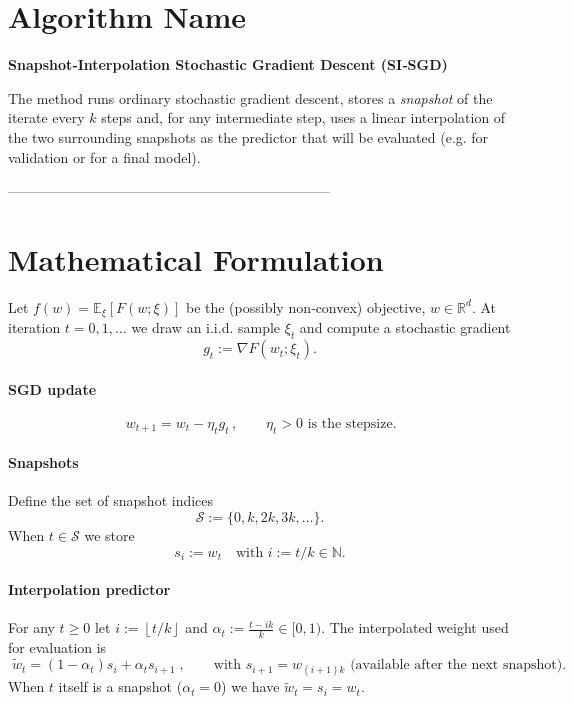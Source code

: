 \documentclass{article}
\newcommand{\R}{\mathbb{R}}
\begin{document}
\section*{Algorithm Name}
\textbf{Snapshot‑Interpolation Stochastic Gradient Descent (SI‑SGD)}  

The method runs ordinary stochastic gradient descent, stores a \emph{snapshot} of the iterate every $k$ steps and, for any intermediate step, uses a linear interpolation of the two surrounding snapshots as the predictor that will be evaluated (e.g. for validation or for a final model).

---------------------------------------------------------------------

\section*{Mathematical Formulation}
Let $f(w)=\mathbb{E}_{\xi}[F(w;\xi)]$ be the (possibly non‑convex) objective, $w\in\R^{d}$.  
At iteration $t=0,1,\dots$ we draw an i.i.d. sample $\xi_t$ and compute a stochastic gradient
\[
g_t:=\nabla F(w_t;\xi_t).
\]

\paragraph{SGD update}
\begin{equation}
\boxed{\,w_{t+1}=w_t-\eta_t g_t\,},\qquad \eta_t>0 \text{ is the stepsize.}
\label{eq:sgd}
\end{equation}

\paragraph{Snapshots}
Define the set of snapshot indices
\[
\mathcal{S}:=\{0,k,2k,3k,\dots\}.
\]
When $t\in\mathcal{S}$ we store
\[
s_{i}:=w_{t}\quad\text{with }i:=t/k\in\mathbb{N}.
\]

\paragraph{Interpolation predictor}
For any $t\ge 0$ let $i:=\left\lfloor t/k\right\rfloor$ and $\alpha_t:=\frac{t-ik}{k}\in[0,1)$.  
The interpolated weight used for evaluation is
\begin{equation}
\boxed{\;\tilde w_t=(1-\alpha_t)s_{i}+ \alpha_t s_{i+1}\;},
\qquad\text{with }s_{i+1}=w_{(i+1)k}\text{ (available after the next snapshot).}
\label{eq:interp}
\end{equation}
When $t$ itself is a snapshot ($\alpha_t=0$) we have $\tilde w_t=s_i=w_t$.
\end{document}
